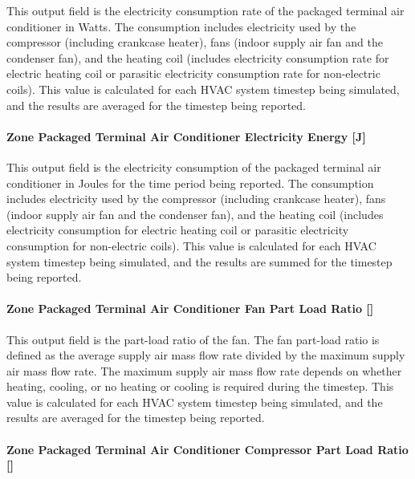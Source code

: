This output field is the electricity consumption rate of the packaged terminal air conditioner in Watts. The consumption includes electricity used by the compressor (including crankcase heater), fans (indoor supply air fan and the condenser fan), and the heating coil (includes electricity consumption rate for electric heating coil or parasitic electricity consumption rate for non-electric coils). This value is calculated for each HVAC system timestep being simulated, and the results are averaged for the timestep being reported.

\paragraph{Zone Packaged Terminal Air Conditioner Electricity Energy {[}J{]}}\label{zone-packaged-terminal-air-conditioner-electric-energy-j}

This output field is the electricity consumption of the packaged terminal air conditioner in Joules for the time period being reported. The consumption includes electricity used by the compressor (including crankcase heater), fans (indoor supply air fan and the condenser fan), and the heating coil (includes electricity consumption for electric heating coil or parasitic electricity consumption for non-electric coils). This value is calculated for each HVAC system timestep being simulated, and the results are summed for the timestep being reported.

\paragraph{Zone Packaged Terminal Air Conditioner Fan Part Load Ratio {[]}}\label{zone-packaged-terminal-air-conditioner-fan-part-load-ratio}

This output field is the part-load ratio of the fan. The fan part-load ratio is defined as the average supply air mass flow rate divided by the maximum supply air mass flow rate. The maximum supply air mass flow rate depends on whether heating, cooling, or no heating or cooling is required during the timestep. This value is calculated for each HVAC system timestep being simulated, and the results are averaged for the timestep being reported.

\paragraph{Zone Packaged Terminal Air Conditioner Compressor Part Load Ratio {[]}}\label{zone-packaged-terminal-air-conditioner-compressor-part-load-ratio}

